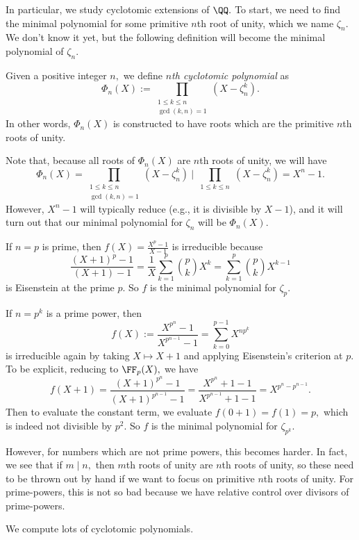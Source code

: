 In particular, we study cyclotomic extensions of $\QQ.$ To start, we need to find the minimal polynomial for some primitive $n$th root of unity, which we name $\zeta_n.$ We don't know it yet, but the following definition will become the minimal polynomial of $\zeta_n.$
\begin{definition}
	Given a positive integer $n,$ we define \textit{$n$th cyclotomic polynomial} as
	\[\Phi_n(X):=\prod_{\substack{1\le k\le n\\\gcd(k,n)=1}}\left(X-\zeta_n^k\right).\]
	In other words, $\Phi_n(X)$ is constructed to have roots which are the primitive $n$th roots of unity.
\end{definition}
Note that, because all roots of $\Phi_n(X)$ are $n$th roots of unity, we will have
\[\Phi_n(X)=\prod_{\substack{1\le k\le n\\\gcd(k,n)=1}}\left(X-\zeta_n^k\right)~\bigg|~\prod_{\substack{1\le k\le n}}\left(X-\zeta_n^k\right)=X^n-1.\]
However, $X^n-1$ will typically reduce (e.g., it is divisible by $X-1$), and it will turn out that our minimal polynomial for $\zeta_n$ will be $\Phi_n(X).$
\begin{example}
	If $n=p$ is prime, then $f(X)=\frac{X^p-1}{X-1}$ is irreducible because
	\[\frac{(X+1)^p-1}{(X+1)-1}=\frac1X\sum_{k=1}^p\binom pkX^k=\sum_{k=1}^p\binom pkX^{k-1}\]
	is Eisenstein at the prime $p.$ So $f$ is the minimal polynomial for $\zeta_p.$
\end{example}
\begin{example} \label{ex:primepowercyclo}
	If $n=p^k$ is a prime power, then
	\[f(X):=\frac{X^{p^n}-1}{X^{p^{n-1}}-1}=\sum_{k=0}^{p-1}X^{np^k}\]
	is irreducible again by taking $X\mapsto X+1$ and applying Eisenstein's criterion at $p.$ To be explicit, reducing to $\FF_p(X),$ we have
	\[f(X+1)=\frac{(X+1)^{p^n}-1}{(X+1)^{p^{n-1}}-1}=\frac{X^{p^n}+1-1}{X^{p^{n-1}}+1-1}=X^{p^n-p^{n-1}}.\]
	Then to evaluate the constant term, we evaluate $f(0+1)=f(1)=p,$ which is indeed not divisible by $p^2.$ So $f$ is the minimal polynomial for $\zeta_{p^k}.$
\end{example}
However, for numbers which are not prime powers, this becomes harder. In fact, we see that if $m\mid n,$ then $m$th roots of unity are $n$th roots of unity, so these need to be thrown out by hand if we want to focus on primitive $n$th roots of unity. For prime-powers, this is not so bad because we have relative control over divisors of prime-powers.
\begin{exe}
	We compute lots of cyclotomic polynomials.
\end{exe}
